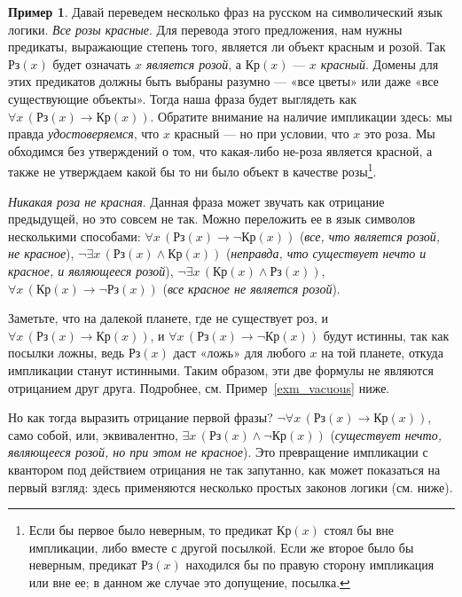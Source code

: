 \documentclass[12pt,notitlepage]{article}
\theoremstyle{plain}
\theoremstyle{definition}
\newtheorem{exm}[thm]{Пример}
\theoremstyle{plain}
\newcommand{\1}{\mathbf{1}}
\newcommand{\0}{\mathbf{0}}
\begin{document}
\begin{exm}
	Давай переведем несколько фраз на русском на символический язык логики. \emph{Все розы красные}. Для перевода этого предложения, нам нужны предикаты, выражающие степень того, является ли объект красным и розой. Так $Рз(x)$ будет означать \emph{$x$ является розой}, а $\text{Кр}(x)$ --- \emph{$x$ красный}. Домены для этих предикатов должны быть выбраны разумно --- «все цветы» или даже «все существующие объекты». Тогда наша фраза будет выглядеть как $\forall x\, (\text{Рз}(x) \to \text{Кр}(x))$. Обратите внимание на наличие импликации здесь: мы правда \emph{удостоверяемся}, что $x$ красный --- но при условии, что $x$ это роза. Мы обходимся без утверждений о том, что какая-либо не-роза является красной, а также не утверждаем какой бы то ни было объект в качестве розы\footnote{Если бы первое было неверным, то предикат $\text{Кр}(x)$ стоял бы вне импликации, либо вместе с другой посылкой. Если же второе было бы неверным, предикат $\text{Рз}(x)$ находился бы по правую сторону импликация или вне ее; в данном же случае это допущение, посылка.}.
	
	\emph{Никакая роза не красная}. Данная фраза может звучать как отрицание предыдущей, но это совсем не так. Можно переложить ее в язык символов несколькими способами: $\forall x\, (\text{Рз}(x) \to \neg \text{Кр}(x))$ (\emph{все, что является розой, не красное}), $\neg \exists x\, (\text{Рз}(x) \wedge \text{Кр}(x))$ (\emph{неправда, что существует нечто и красное, и являющееся розой}), $\neg \exists x\, (\text{Кр}(x) \wedge \text{Рз}(x))$, $\forall x\, (\text{Кр}(x) \to \neg \text{Рз}(x))$ (\emph{все красное не является розой}).
	
	Заметьте, что на далекой планете, где не существует роз, и $\forall x\, (\text{Рз}(x) \to \text{Кр}(x))$, и $\forall x\, (\text{Рз}(x) \to \neg \text{Кр}(x))$ будут истинны, так как посылки ложны, ведь $\text{Рз}(x)$ даст «ложь» для любого $x$ на той планете, откуда импликации станут истинными. Таким образом, эти две формулы не являются отрицанием друг друга. Подробнее, см. Пример~\ref{exm_vacuous} ниже.
	
	Но как тогда выразить отрицание первой фразы? $\neg \forall x\, (\text{Рз}(x) \to \text{Кр}(x))$, само собой, или, эквивалентно, $\exists x\, (\text{Рз}(x) \wedge \neg \text{Кр}(x))$ (\emph{существует нечто, являющееся розой, но при этом не красное}). Это превращение импликации с квантором под действием отрицания не так запутанно, как может показаться на первый взгляд: здесь применяются несколько простых законов логики (см. ниже).
\end{exm}
\end{document}
